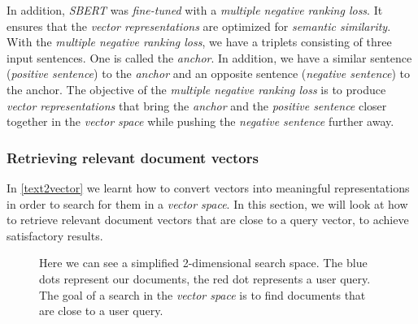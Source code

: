 \documentclass{article}
\begin{document}
In addition, \textit{SBERT} was \textit{fine-tuned} with a \textit{multiple negative ranking loss}. It ensures that the \textit{vector representations} are optimized for \textit{semantic similarity}. With the \textit{multiple negative ranking loss}, we have a triplets consisting of three input sentences. One is called the \textit{anchor}. In addition, we have a similar sentence (\textit{positive sentence}) to the \textit{anchor} and an opposite sentence (\textit{negative sentence}) to the anchor. The objective of the \textit{multiple negative ranking loss} is to produce \textit{vector representations} that bring the \textit{anchor} and the \textit{positive sentence} closer together in the \textit{vector space} while pushing the \textit{negative sentence} further away.


\subsubsection{Retrieving relevant document vectors} \label{retrieving}
In \cref{text2vector} we learnt how to convert vectors into meaningful representations in order to search for them in a \textit{vector space}. In this section, we will look at how to retrieve relevant document vectors that are close to a query vector, to achieve satisfactory results.

\begin{figure}[H]
    \centering
{}
\caption{Here we can see a simplified 2-dimensional search space. The blue dots represent our documents, the red dot represents a user query. The goal of a search in the \textit{vector space} is to find documents that are close to a user query.}
\label{vectorSpaceSearch}
\end{figure}
\end{document}
